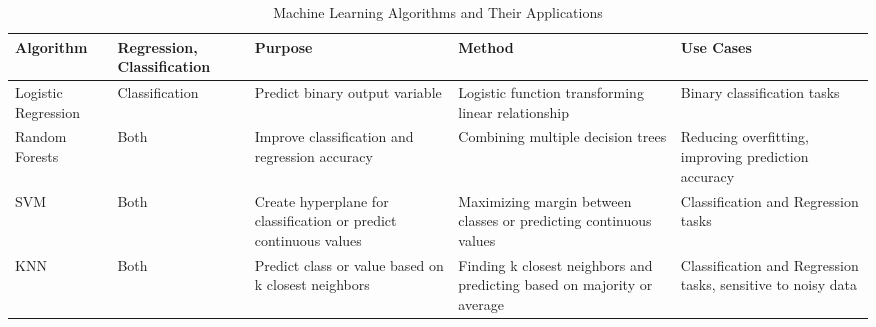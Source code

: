 \begin{table}[h!]
\centering
\setlength{\tabcolsep}{4pt}  %
\small  %

\begin{tabularx}{\textwidth}{|X|X|X|X|X|}
\hline
\textbf{Algorithm} & \textbf{Regression, Classification} & \textbf{Purpose} & \textbf{Method} & \textbf{Use Cases} \\
\hline
Logistic Regression & Classification & Predict binary output variable & Logistic function transforming linear relationship & Binary classification tasks \\
\hline
Random Forests & Both & Improve classification and regression accuracy & Combining multiple decision trees & Reducing overfitting, improving prediction accuracy \\
\hline
SVM & Both & Create hyperplane for classification or predict continuous values & Maximizing margin between classes or predicting continuous values & Classification and Regression tasks \\
\hline
KNN & Both & Predict class or value based on k closest neighbors & Finding k closest neighbors and predicting based on majority or average & Classification and Regression tasks, sensitive to noisy data \\
\hline
\end{tabularx}
\caption{Machine Learning Algorithms and Their Applications}
\label{tab:ml_algorithms}
\end{table}